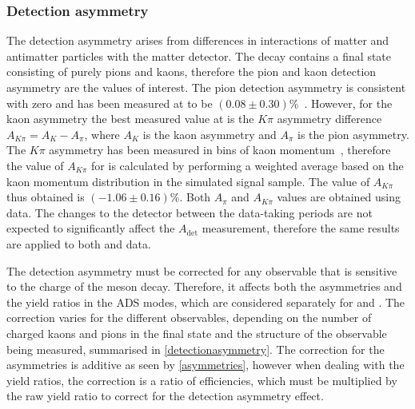\subsubsection{Detection asymmetry}

The detection asymmetry arises from differences in interactions of matter and antimatter particles with the matter detector. The \btodkst decay contains a final state consisting of purely pions and kaons, therefore the pion and kaon detection asymmetry are the values of interest. The pion detection asymmetry is consistent with zero and has been measured at \lhcb to be $(0.08 \pm 0.30)\%$~\cite{pi_det_asym}. However, for the kaon asymmetry the best measured value at \lhcb is the $K\pi$ asymmetry difference $A_{K\pi} = A_K - A_{\pi}$, where $A_K$ is the kaon asymmetry and $A_{\pi}$ is the pion asymmetry. The $K\pi$ asymmetry has been measured in bins of kaon momentum~\cite{k_det_asym}, therefore the value of $A_{K\pi}$ for \btodkst is calculated by performing a weighted average based on the kaon momentum distribution in the simulated signal sample. The value of $A_{K\pi}$ thus obtained is $(-1.06 \pm 0.16)\%$. Both $A_{\pi}$ and $A_{K\pi}$ values are obtained using \runone data. The changes to the detector between the data-taking periods are not expected to significantly affect the $A_{\text{det}}$ measurement, therefore the same results are applied to both \runone and \runtwo data. 

The detection asymmetry must be corrected for any \CP observable that is sensitive to the charge of the \B meson decay. Therefore, it affects both the asymmetries and the yield ratios in the ADS modes, which are considered separately for \Bm and \Bp. The correction varies for the different \CP observables, depending on the number of charged kaons and pions in the final state and the structure of the \CP observable being measured, summarised in \Tab\ref{detectionasymmetry}. The correction for the asymmetries is additive as seen by \eqn\ref{asymmetries}, however when dealing with the yield ratios, the correction is a ratio of efficiencies, which must be multiplied by the raw yield ratio to correct for the detection asymmetry effect.

